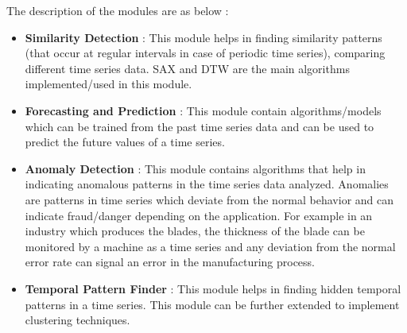 \documentclass[12pt,a4paper]{report}
\begin{document}
\noindent
The description of the modules are as below :
\begin{itemize}
\item \textbf{Similarity Detection} : This module helps in finding similarity patterns (that occur at regular intervals in case of periodic time series), comparing different time series data. SAX and DTW are the main algorithms implemented/used in this module.
\item \textbf{Forecasting and Prediction} : This module contain algorithms/models which can be trained from the past time series data and can be used to predict the future values of a time series. 
\item \textbf{Anomaly Detection} : This module contains algorithms that help in indicating anomalous patterns in the time series data analyzed. Anomalies are patterns in time series which deviate from the normal behavior and can indicate fraud/danger depending on the application. For example in an industry which produces the blades, the thickness of the blade can be monitored by a machine as a time series and any deviation from the normal error rate can signal an error in the manufacturing process.
\item \textbf{Temporal Pattern Finder } : This module helps in finding hidden temporal patterns in a time series. This module can be further extended to implement clustering techniques.
\end{itemize}
\end{document}
